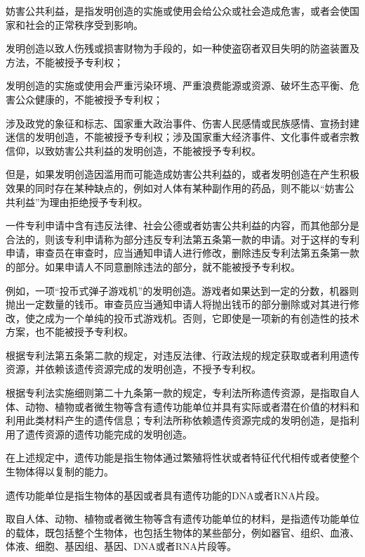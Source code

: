 妨害公共利益，是指发明创造的实施或使用会给公众或社会造成危害，或者会使国家和社会的正常秩序受到影响。

{\par}

发明创造以致人伤残或损害财物为手段的，如一种使盗窃者双目失明的防盗装置及方法，不能被授予专利权；

发明创造的实施或使用会严重污染环境、严重浪费能源或资源、破坏生态平衡、危害公众健康的，不能被授予专利权；

涉及政党的象征和标志、国家重大政治事件、伤害人民感情或民族感情、宣扬封建迷信的发明创造，不能被授予专利权；涉及国家重大经济事件、文化事件或者宗教信仰，以致妨害公共利益的发明创造，不能被授予专利权。

但是，如果发明创造因滥用而可能造成妨害公共利益的，或者发明创造在产生积极效果的同时存在某种缺点的，例如对人体有某种副作用的药品，则不能以“妨害公共利益”为理由拒绝授予专利权。

一件专利申请中含有违反法律、社会公德或者妨害公共利益的内容，而其他部分是合法的，则该专利申请称为部分违反专利法第五条第一款的申请。对于这样的专利申请，审查员在审查时，应当通知申请人进行修改，删除违反专利法第五条第一款的部分。如果申请人不同意删除违法的部分，就不能被授予专利权。

例如，一项“投币式弹子游戏机”的发明创造。游戏者如果达到一定的分数，机器则抛出一定数量的钱币。审查员应当通知申请人将抛出钱币的部分删除或对其进行修改，使之成为一个单纯的投币式游戏机。否则，它即使是一项新的有创造性的技术方案，也不能被授予专利权。

根据专利法第五条第二款的规定，对违反法律、行政法规的规定获取或者利用遗传资源，并依赖该遗传资源完成的发明创造，不授予专利权。

根据专利法实施细则第二十九条第一款的规定，专利法所称遗传资源，是指取自人体、动物、植物或者微生物等含有遗传功能单位并具有实际或者潜在价值的材料和利用此类材料产生的遗传信息；专利法所称依赖遗传资源完成的发明创造，是指利用了遗传资源的遗传功能完成的发明创造。

在上述规定中，遗传功能是指生物体通过繁殖将性状或者特征代代相传或者使整个生物体得以复制的能力。

遗传功能单位是指生物体的基因或者具有遗传功能的DNA或者RNA片段。

取自人体、动物、植物或者微生物等含有遗传功能单位的材料，是指遗传功能单位的载体，既包括整个生物体，也包括生物体的某些部分，例如器官、组织、血液、体液、细胞、基因组、基因、DNA或者RNA片段等。

